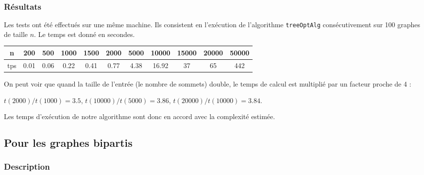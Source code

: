 \documentclass[a4paper,10pt]{article}
\begin{document}
\subsubsection{Résultats}

Les tests ont été effectués sur une même machine. Ils consistent en l'exécution de l'algorithme \texttt{treeOptAlg} consécutivement sur 100 graphes de taille $n$. Le temps est donné en secondes.
\begin{center}
\begin{tabular}{|c|c|c|c|c|c|c|c|c|c|c|}
	\hline 
	n & 200 & 500 & 1000 & 1500 & 2000 & 5000 & 10000 & 15000 & 20000 & 50000 \\
	\hline
	tps & 0.01 & 0.06 & 0.22 & 0.41 & 0.77 & 4.38 & 16.92 & 37 & 65 & 442 \\
	\hline
\end{tabular}
\end{center}

On peut voir que quand la taille de l'entrée (le nombre de sommets) double, le temps de calcul est multiplié par un facteur proche de 4 :

$t(2000)/t(1000) = 3.5$, $t(10000)/t(5000) = 3.86$, $t(20000)/t(10000) = 3.84$.

Les temps d'exécution de notre algorithme sont donc en accord avec la complexité estimée.

\subsection{Pour les graphes bipartis}

\subsubsection{Description}
\end{document}
